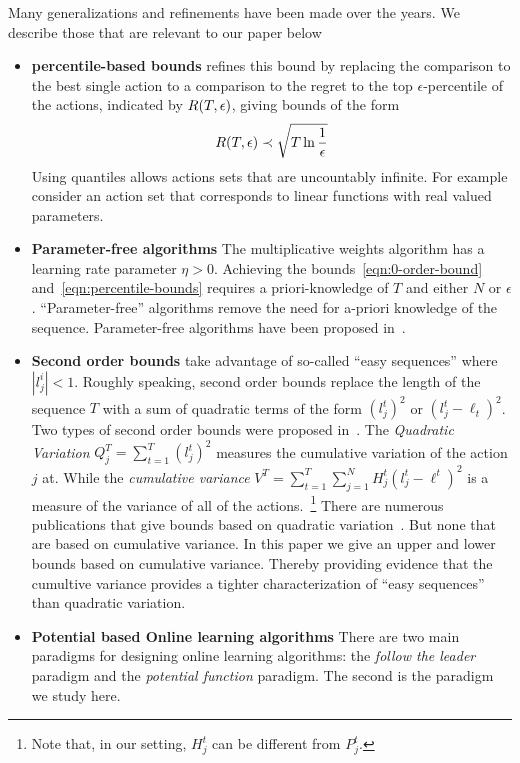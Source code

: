 \documentclass{article}[12pt]
\begin{document}
Many generalizations and refinements have been made over the years. We
describe those that are relevant to our paper below
\begin{itemize}
\item{\bf percentile-based bounds} \cite{freund1999adaptive} refines
  this bound by replacing the comparison to the best single action to
  a comparison to the regret to the top $\epsilon$-percentile of the
  actions, indicated by $R(T,\epsilon)$, giving bounds of the form
\begin{equation} \label{eqn:percentile-bounds}
R(T,\epsilon) \prec \sqrt{T \ln \frac{1}{\epsilon}}
\end{equation}
Using quantiles allows actions sets that are uncountably infinite.
For example consider an action set that corresponds to linear
functions with real valued parameters.

\item{\bf Parameter-free algorithms} The multiplicative weights
  algorithm has a learning rate parameter $\eta>0$. Achieving the
  bounds~\ref{eqn:0-order-bound} and~\ref{eqn:percentile-bounds}
  requires a priori-knowledge of $T$ and either $N$ or       
  $\epsilon$. ``Parameter-free'' algorithms remove the need for
  a-priori knowledge of the sequence. Parameter-free algorithms have
  been proposed in~\cite{chaudhuri2009parameter,
    chernov2010prediction,orabona2016coin,cutkosky2018black}.

\item{\bf Second order bounds} take advantage of so-called ``easy
  sequences'' where $|l_j^i|<1$. Roughly speaking, second order bounds
  replace the length of the sequence $T$ with a sum of quadratic terms
  of the form $(l_j^t)^2$ or $(l_j^t-\ell_t)^2$. Two types of second
  order bounds were proposed in~\cite{cesa2007improved}.  The {\em
    Quadratic Variation} $Q_j^T=\sum_{t=1}^T (l_j^t)^2$ measures the
  cumulative variation of the action $j$ at. While the {\em cumulative
    variance}
  $V^T = \sum_{t=1}^T \sum_{j=1}^N H^t_j (l_j^t - \ell^t)^2$ is a
  measure of the variance of all of the actions.~\footnote{Note that, in our setting, $H_j^t$ can be different from $P_j^t$.} There are numerous
  publications that give bounds based on quadratic
  variation~\cite{chernov2009prediction,hazan2010extracting,gaillard2014second,koolen2015second}. But
  none that are based on cumulative variance. In this paper we give an
  upper and lower bounds based on cumulative variance. Thereby
  providing evidence that the cumultive variance provides a tighter
  characterization of ``easy sequences'' than quadratic variation.
  
\item {\bf Potential based Online learning algorithms} There are two
  main paradigms for designing online learning algorithms: the {\em
    follow the leader} paradigm and the {\em potential function}
  paradigm.  The second is the paradigm we study here.  
\end{itemize}
\end{document}
